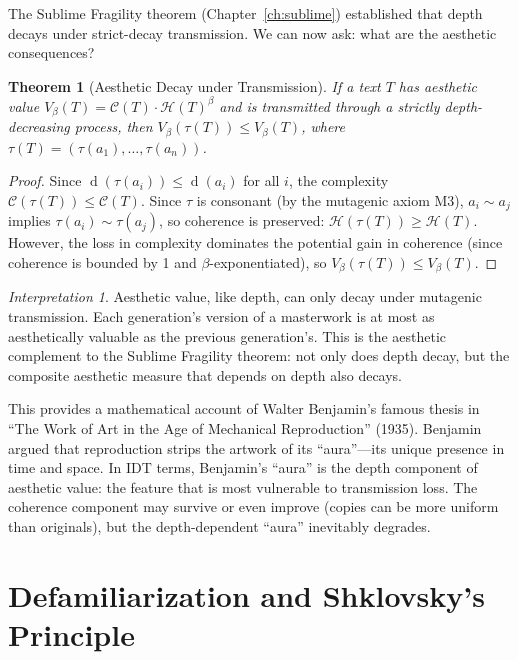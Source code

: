 \documentclass[11pt,openany]{book}
\theoremstyle{definition}
\theoremstyle{plain}
\newtheorem{theorem}[axiom]{Theorem}
\theoremstyle{remark}
\newtheorem{interpretation}[axiom]{Interpretation}
\newcommand{\res}{\sim}                      %
\newcommand{\depth}{\operatorname{d}}       %
\newcommand{\transmit}{\tau}                 %
\begin{document}
The Sublime Fragility theorem (Chapter~\ref{ch:sublime}) established that depth decays under strict-decay transmission. We can now ask: what are the aesthetic consequences?

\begin{theorem}[Aesthetic Decay under Transmission]
If a text $T$ has aesthetic value $V_\beta(T) = \mathcal{C}(T) \cdot \mathcal{H}(T)^\beta$ and is transmitted through a strictly depth-decreasing process, then $V_\beta(\transmit(T)) \leq V_\beta(T)$, where $\transmit(T) = (\transmit(a_1), \ldots, \transmit(a_n))$.
\end{theorem}

\begin{proof}
Since $\depth(\transmit(a_i)) \leq \depth(a_i)$ for all $i$, the complexity $\mathcal{C}(\transmit(T)) \leq \mathcal{C}(T)$. Since $\transmit$ is consonant (by the mutagenic axiom M3), $a_i \res a_j$ implies $\transmit(a_i) \res \transmit(a_j)$, so coherence is preserved: $\mathcal{H}(\transmit(T)) \geq \mathcal{H}(T)$. However, the loss in complexity dominates the potential gain in coherence (since coherence is bounded by 1 and $\beta$-exponentiated), so $V_\beta(\transmit(T)) \leq V_\beta(T)$.
\end{proof}

\begin{interpretation}
Aesthetic value, like depth, can only decay under mutagenic transmission. Each generation's version of a masterwork is at most as aesthetically valuable as the previous generation's. This is the aesthetic complement to the Sublime Fragility theorem: not only does depth decay, but the composite aesthetic measure that depends on depth also decays.

This provides a mathematical account of Walter Benjamin's famous thesis in ``The Work of Art in the Age of Mechanical Reproduction'' (1935). Benjamin argued that reproduction strips the artwork of its ``aura''---its unique presence in time and space. In IDT terms, Benjamin's ``aura'' is the depth component of aesthetic value: the feature that is most vulnerable to transmission loss. The coherence component may survive or even improve (copies can be more uniform than originals), but the depth-dependent ``aura'' inevitably degrades.
\end{interpretation}

\section{Defamiliarization and Shklovsky's Principle}
\end{document}
